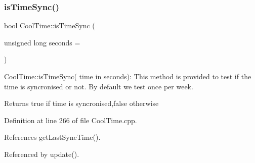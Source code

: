 \subsubsection{\texorpdfstring{is\+Time\+Sync()}{isTimeSync()}}
{\footnotesize\ttfamily bool Cool\+Time\+::is\+Time\+Sync (\begin{DoxyParamCaption}\item[{unsigned long}]{seconds = {} }\end{DoxyParamCaption})}

Cool\+Time\+::is\+Time\+Sync( time in seconds)\+: This method is provided to test if the time is syncronised or not. By default we test once per week.

\begin{DoxyReturn}{Returns}
true if time is syncronised,false otherwise 
\end{DoxyReturn}


Definition at line 266 of file Cool\+Time.\+cpp.



References get\+Last\+Sync\+Time().



Referenced by update().


